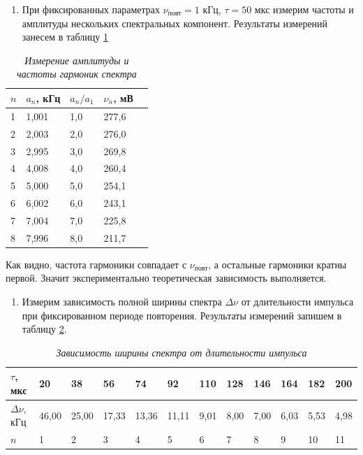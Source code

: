\documentclass[a4paper,12pt]{article}
\begin{document}
\FloatBarrier

\begin{enumerate}[resume]
    \item При фиксированных параметрах $\nu_\text{повт} = 1$ кГц, $\tau = 50$ мкс измерим частоты и амплитуды нескольких спектральных компонент. Результаты измерений занесем в таблицу \ref{table:1}
\end{enumerate}

\begin{table}[!ht]
    \centering
    \caption{\textit{Измерение амплитуды и частоты гармоник спектра}}
    \begin{tabular}{|l|l|l|l|l|}
        \hline
        $n$ & $a_n$, кГц & $a_n/a_1$ & $\nu_n$, мВ \\ \hline
        1 & 1,001     & 1,0       & 277,6  \\ \hline
        2 & 2,003     & 2,0       & 276,0  \\ \hline
        3 & 2,995     & 3,0       & 269,8  \\ \hline
        4 & 4,008     & 4,0       & 260,4  \\ \hline
        5 & 5,000     & 5,0       & 254,1  \\ \hline
        6 & 6,002     & 6,0       & 243,1  \\ \hline
        7 & 7,004     & 7,0       & 225,8  \\ \hline
        8 & 7,996     & 8,0       & 211,7  \\ \hline                 
    \end{tabular}
    \label{table:1}
\end{table}

Как видно, частота гармоники совпадает с $\nu_\text{повт}$, а остальные гармоники кратны первой. Значит экспериментально теоретическая зависимость выполняется.

\begin{enumerate}[resume]
    \item Измерим зависимость полной ширины спектра $\Delta \nu$ от длительности импульса при фиксированном периоде повторения. Результаты измерений запишем в таблицу \ref{table:2}.
\end{enumerate}

\begin{table}[!ht]
    \centering
    \caption{\textit{Зависимость ширины спектра от длительности импульса}}
    \begin{tabular}{|l|l|l|l|l|l|l|l|l|l|l|l|}
        \hline
        $\tau$, мкс       & 20    & 38    & 56    & 74    & 92    & 110  & 128  & 146  & 164  & 182  & 200  \\ \hline
        $\Delta \nu$, кГц & 46,00 & 25,00 & 17,33 & 13,36 & 11,11 & 9,01 & 8,00 & 7,00 & 6,03 & 5,53 & 4,98 \\ \hline
        $n$               & 1     & 2     & 3     & 4     & 5     & 6    & 7    & 8    & 9    & 10   & 11   \\ \hline
    \end{tabular}
    \label{table:2}
\end{table}
\end{document}
